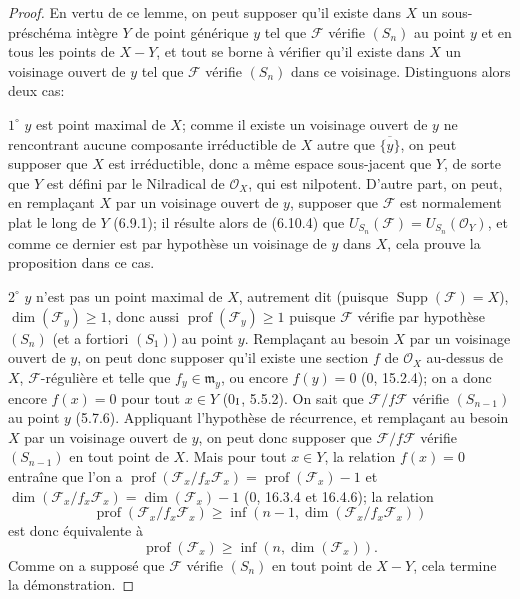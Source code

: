 \begin{proof}

En vertu de ce lemme, on peut supposer qu'il existe dans $X$ un
sous-préschéma intègre $Y$ de point générique $y$ tel que $\mathcal F$
vérifie $(S_n)$ au point $y$ et en tous les points de $X-Y$, et tout se
borne à vérifier qu'il existe dans $X$ un voisinage ouvert de $y$ tel que
$\mathcal F$ vérifie $(S_n)$ dans ce voisinage. Distinguons alors deux cas:

$1^\circ$ $y$ est point maximal de $X$; comme il existe un voisinage ouvert
de $y$ ne rencontrant aucune composante irréductible de $X$ autre que
$\overline{\{y\}}$, on peut supposer que $X$ est irréductible, donc a même
espace sous-jacent que $Y$, de sorte que $Y$ est défini par le Nilradical de
$\mathcal O_X$, qui est nilpotent. D'autre part, on peut, en remplaçant $X$
par un voisinage ouvert de $y$, supposer que $\mathcal F$ est normalement
plat le long de $Y$ (6.9.1); il résulte alors de (6.10.4) que
$U_{S_n}(\mathcal F)=U_{S_n}(\mathcal O_Y)$, et comme ce dernier est par
hypothèse un voisinage de $y$ dans $X$, cela prouve la proposition dans ce
cas.

$2^\circ$ $y$ n'est pas un point maximal de $X$, autrement dit (puisque
$\operatorname{Supp}(\mathcal F)=X$), $\dim(\mathcal F_y)\geq1$, donc aussi
$\operatorname{prof}(\mathcal F_y)\geq1$ puisque $\mathcal F$ vérifie par
hypothèse $(S_n)$ (et a fortiori $(S_1)$) au point $y$. Remplaçant au besoin
$X$ par un voisinage ouvert de $y$, on peut donc supposer qu'il existe une
section $f$ de $\mathcal O_X$ au-dessus de $X$, $\mathcal F$-régulière et
telle que $f_y\in\mathfrak m_y$, ou encore $f(y)=0$ (0, 15.2.4); on a donc
encore $f(x)=0$ pour tout $x\in Y$ (0$_{\rm I}$, 5.5.2). On sait que
$\mathcal F/f\mathcal F$ vérifie $(S_{n-1})$ au point $y$ (5.7.6).
Appliquant l'hypothèse de récurrence, et remplaçant au besoin $X$ par un
voisinage ouvert de $y$, on peut donc supposer que
$\mathcal F/f\mathcal F$ vérifie $(S_{n-1})$ en tout point de $X$. Mais pour
tout $x\in Y$, la relation $f(x)=0$ entraîne que l'on a
$\operatorname{prof}(\mathcal F_x/f_x\mathcal F_x)=
\operatorname{prof}(\mathcal F_x)-1$ et
$\dim(\mathcal F_x/f_x\mathcal F_x)=\dim(\mathcal F_x)-1$
(0, 16.3.4 et 16.4.6); la relation
\[
\operatorname{prof}(\mathcal F_x/f_x\mathcal F_x)\geq
\inf(n-1,\dim(\mathcal F_x/f_x\mathcal F_x))
\]
est donc équivalente à
\[
\operatorname{prof}(\mathcal F_x)\geq\inf(n,\dim(\mathcal F_x)).
\]
Comme on a supposé que $\mathcal F$ vérifie $(S_n)$ en tout point de $X-Y$,
cela termine la démonstration.
\end{proof}

